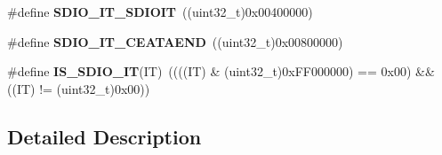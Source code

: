 \begin{DoxyCompactItemize}
\item 
\hypertarget{group___s_d_i_o___interrupt__sources_gaf5d7559460a9ff1fccc82d815de25cb4}{\#define {\bfseries S\-D\-I\-O\-\_\-\-I\-T\-\_\-\-S\-D\-I\-O\-I\-T}~((uint32\-\_\-t)0x00400000)}\label{group___s_d_i_o___interrupt__sources_gaf5d7559460a9ff1fccc82d815de25cb4}

\item 
\hypertarget{group___s_d_i_o___interrupt__sources_gae045cd5ba681d2df8b1031b8f659139a}{\#define {\bfseries S\-D\-I\-O\-\_\-\-I\-T\-\_\-\-C\-E\-A\-T\-A\-E\-N\-D}~((uint32\-\_\-t)0x00800000)}\label{group___s_d_i_o___interrupt__sources_gae045cd5ba681d2df8b1031b8f659139a}

\item 
\hypertarget{group___s_d_i_o___interrupt__sources_ga0e413e92ec50bab73042e8965acc3e6c}{\#define {\bfseries I\-S\-\_\-\-S\-D\-I\-O\-\_\-\-I\-T}(I\-T)~((((I\-T) \& (uint32\-\_\-t)0x\-F\-F000000) == 0x00) \&\& ((\-I\-T) != (uint32\-\_\-t)0x00))}\label{group___s_d_i_o___interrupt__sources_ga0e413e92ec50bab73042e8965acc3e6c}

\end{DoxyCompactItemize}


\subsection{Detailed Description}
